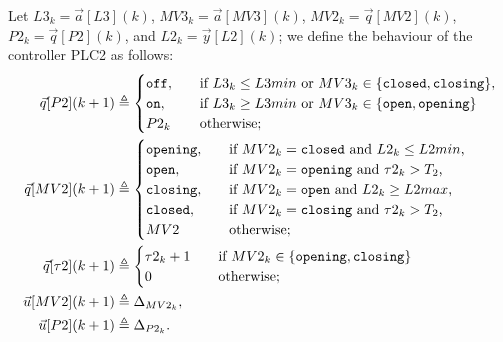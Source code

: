 {Let $L3_k=\vec{a}[L3](k)$, $MV3_k=\vec{a}[MV3](k)$, $MV2_k=\vec{q}[MV2](k)$, $P2_k=\vec{q}[P2](k)$, and $L2_k=\vec{y}[L2](k)$; we define the behaviour of the controller PLC2 as follows:
\begin{align}
\vec{q}[P2](k+1)&\triangleq
    \begin{cases}
      \texttt{off},&\quad \text{if $L3_k\leq L3min$ or $MV3_k\in \set{\texttt{closed},\texttt{closing}}$},\\
      \texttt{on},&\quad \text{if $L3_k \geq L3min$ or $MV3_k\in \set{\texttt{open},\texttt{opening}}$}\\
      P2_k&\quad \text{otherwise;}
    \end{cases}\\
\vec{q}[MV2](k+1)&\triangleq
  \begin{cases}
    \texttt{opening},&\quad \text{if $MV2_k=\texttt{closed}$ and $L2_k\leq L2min$,}\\
    \texttt{open},&\quad \text{if $MV2_k=\texttt{opening}$ and $\tau2_k>T_2$,}\\
    \texttt{closing},&\quad \text{if $MV2_k=\texttt{open}$ and $L2_k\geq L2max$,}\\
    \texttt{closed},&\quad \text{if $MV2_k=\texttt{closing}$ and $\tau2_k>T_2$,}\\
    MV2&\quad \text{otherwise;}    
  \end{cases}\\
\vec{q}[\tau2](k+1)&\triangleq
\begin{cases}
  \tau2_k+1 &\quad \text{if $MV2_k\in \set{\texttt{opening},\texttt{closing}}$}\\
  0&\quad \text{otherwise;}    
\end{cases}\\
\vec{u}[MV2](k+1)&\triangleq\const_{MV2_k},\\%
\vec{u}[P2](k+1)&\triangleq\const_{P2_k}.%
\end{align}
}
